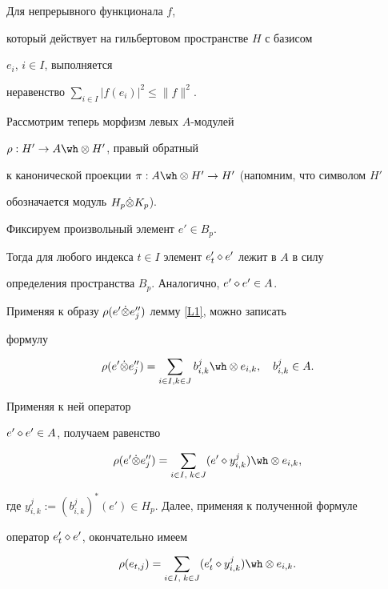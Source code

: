 \begin{lem}


\label{L3}


Для непрерывного функционала $f$, 


который действует на гильбертовом пространстве $H$ с базисом


$e_i$, $i \in I$, выполняется


неравенство $\sum\limits_{i \in I} | f(e_i)|^2 \le \| f\|^2 $.


\end{lem}





Рассмотрим теперь морфизм левых $A$-модулей


$\rho :H' \to A \tens H'$, правый обратный


к канонической проекции $\pi :A \tens H' \to H'$ (напомним, что символом $H'$


обозначается модуль $H_p \Dot \otimes K_p$).


Фиксируем произвольный элемент $e' \in B_p$.


Тогда для любого индекса $t \in I$ элемент $e'_t \diamond e'$ лежит в $A$ в силу


определения пространства $B_p$. Аналогично, $e' \diamond e' \in A$.





Применяя к образу $\rho (e' \Dot \otimes e_j'')$ лемму \ref{L1}, можно записать


формулу


$$


\rho (e' \tenp e_j'' )=\sumik b^j_{i,k} \tens e_{i,k},\quad b^j_{i,k} \in A.


$$


Применяя к ней оператор


$e' \diamond e' \in A$, получаем равенство


$$


\rho (e' \tenp e_j'')=\sumkki (e' \dia


y^j_{i,k}) \tens e_{i,k},


$$


где $y^j_{i,k}:= (b^j_{i,k})^*(e')


\in H_p$. Далее, применяя к полученной формуле


оператор $e'_t \diamond e'$, окончательно имеем


\begin{equation} \label{eq6}


\rho (e_{t,j})=\sumkki (e'_t \dia


y^j_{i,k}) \tens e_{i,k}.


\end{equation}





